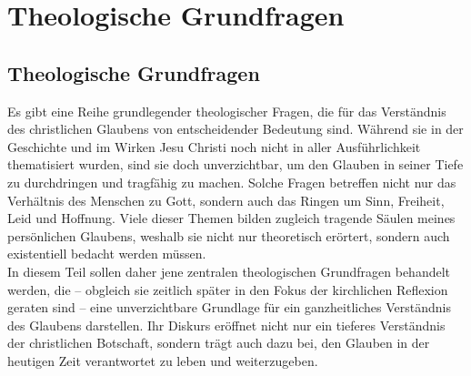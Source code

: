 \part{Theologische Grundfragen}
\chapter*{Theologische Grundfragen}
Es gibt eine Reihe grundlegender theologischer Fragen, die für das Verständnis des christlichen Glaubens von entscheidender Bedeutung sind. Während sie in der Geschichte und im Wirken Jesu Christi noch nicht in aller Ausführlichkeit thematisiert wurden, sind sie doch unverzichtbar, um den Glauben in seiner Tiefe zu durchdringen und tragfähig zu machen. Solche Fragen betreffen nicht nur das Verhältnis des Menschen zu Gott, sondern auch das Ringen um Sinn, Freiheit, Leid und Hoffnung. Viele dieser Themen bilden zugleich tragende Säulen meines persönlichen Glaubens, weshalb sie nicht nur theoretisch erörtert, sondern auch existentiell bedacht werden müssen.\\

In diesem Teil sollen daher jene zentralen theologischen Grundfragen behandelt werden, die – obgleich sie zeitlich später in den Fokus der kirchlichen Reflexion geraten sind – eine unverzichtbare Grundlage für ein ganzheitliches Verständnis des Glaubens darstellen. Ihr Diskurs eröffnet nicht nur ein tieferes Verständnis der christlichen Botschaft, sondern trägt auch dazu bei, den Glauben in der heutigen Zeit verantwortet zu leben und weiterzugeben.






